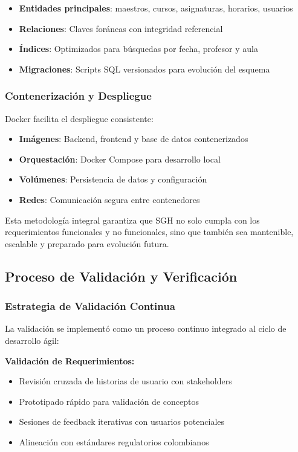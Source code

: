 \begin{itemize}
\item \textbf{Entidades principales}: maestros, cursos, asignaturas, horarios, usuarios
\item \textbf{Relaciones}: Claves foráneas con integridad referencial
\item \textbf{Índices}: Optimizados para búsquedas por fecha, profesor y aula
\item \textbf{Migraciones}: Scripts SQL versionados para evolución del esquema
\end{itemize}

\subsubsection{Contenerización y Despliegue}

Docker facilita el despliegue consistente:

\begin{itemize}
\item \textbf{Imágenes}: Backend, frontend y base de datos contenerizados
\item \textbf{Orquestación}: Docker Compose para desarrollo local
\item \textbf{Volúmenes}: Persistencia de datos y configuración
\item \textbf{Redes}: Comunicación segura entre contenedores
\end{itemize}

Esta metodología integral garantiza que SGH no solo cumpla con los requerimientos funcionales y no funcionales, sino que también sea mantenible, escalable y preparado para evolución futura.

\subsection{Proceso de Validación y Verificación}

\subsubsection{Estrategia de Validación Continua}

La validación se implementó como un proceso continuo integrado al ciclo de desarrollo ágil:

\textbf{Validación de Requerimientos:}
\begin{itemize}
\item Revisión cruzada de historias de usuario con stakeholders
\item Prototipado rápido para validación de conceptos
\item Sesiones de feedback iterativas con usuarios potenciales
\item Alineación con estándares regulatorios colombianos
\end{itemize}

